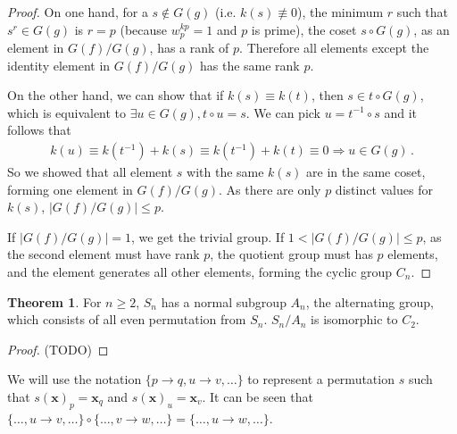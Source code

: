 \documentclass[]{article}
\theoremstyle{definition}\newtheorem{theorem}{Theorem}
\begin{document}
\begin{proof}
	On one hand, for a $s\notin G(g)$ (i.e. $k(s) \not\equiv 0$), the minimum $r$ such that $s^r \in G(g)$ is $r = p$ (because $w_p^{kp} = 1$ and $p$ is prime), the coset $s\circ G(g)$, as an element in $G(f) / G(g)$, has a rank of $p$. Therefore all elements except the identity element in $G(f) / G(g)$ has the same rank $p$.
	
	On the other hand, we can show that if $k(s)\equiv k(t)$, then $s\in t\circ G(g)$, which is equivalent to $\exists u \in G(g), t\circ u = s$. We can pick $u = t^{-1}\circ{s}$ and it follows that
	\begin{align*}
	k(u) \equiv k(t^{-1}) + k(s) \equiv k(t^{-1}) + k(t) \equiv 0 \Rightarrow u \in G(g)\,.
	\end{align*}
	So we showed that all element $s$ with the same $k(s)$ are in the same coset, forming one element in $G(f) / G(g)$. As there are only $p$ distinct values for $k(s)$, $|G(f) / G(g)| \le p$.
	
	If $|G(f) / G(g)| = 1$, we get the trivial group. If $1 < |G(f) / G(g)| \le p$, as the second element must have rank $p$, the quotient group must has $p$ elements, and the element generates all other elements, forming the cyclic group $C_n$.
	
	
\end{proof}

\begin{theorem}
	\label{reduce-sn1}
	For $n \ge 2$, $S_n$ has a normal subgroup $A_n$, the alternating group, which consists of all even permutation from $S_n$. $S_n/A_n$ is isomorphic to $C_2$.
\end{theorem}
\begin{proof}
		(TODO)
\end{proof}

We will use the notation $\{p\rightarrow q, u\rightarrow v,\dots\}$ to represent a permutation $s$ such that $s(\mathbf{x})_p = \mathbf{x}_q$ and $s(\mathbf{x})_u = \mathbf{x}_v$. It can be seen that $\{\dots,u\rightarrow v,\dots\}\circ\{\dots,v\rightarrow w,\dots\}=\{\dots,u\rightarrow w,\dots\}$.
\end{document}
